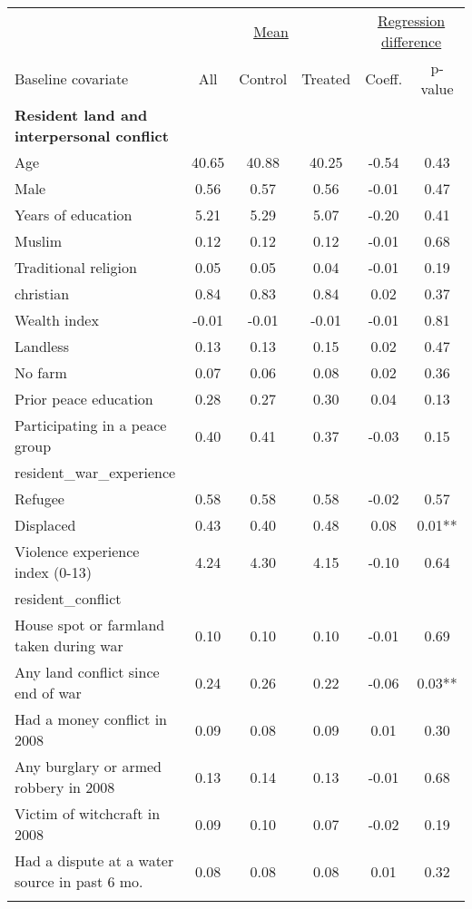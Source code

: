 \begin{tabular}{lccccc}
\hline \noalign{\smallskip} & \multicolumn{3}{c}{\uline{\hfill Mean \hfill}} & \multicolumn{2}{c}{\uline{\hfill Regression difference \hfill}}\\
Baseline covariate & All & Control & Treated & Coeff. & p-value\\
\noalign{\smallskip}\hline \noalign{\smallskip}\textbf{Resident land and interpersonal conflict} &  &  &  &  & \\
Age & 40.65 & 40.88 & 40.25 & -0.54 & 0.43\\
Male & 0.56 & 0.57 & 0.56 & -0.01 & 0.47\\
Years of education & 5.21 & 5.29 & 5.07 & -0.20 & 0.41\\
Muslim & 0.12 & 0.12 & 0.12 & -0.01 & 0.68\\
Traditional religion & 0.05 & 0.05 & 0.04 & -0.01 & 0.19\\
christian & 0.84 & 0.83 & 0.84 & 0.02 & 0.37\\
Wealth index & -0.01 & -0.01 & -0.01 & -0.01 & 0.81\\
Landless & 0.13 & 0.13 & 0.15 & 0.02 & 0.47\\
No farm & 0.07 & 0.06 & 0.08 & 0.02 & 0.36\\
Prior peace education & 0.28 & 0.27 & 0.30 & 0.04 & 0.13\\
Participating in a peace group & 0.40 & 0.41 & 0.37 & -0.03 & 0.15\\
resident_war_experience &  &  &  &  & \\
Refugee & 0.58 & 0.58 & 0.58 & -0.02 & 0.57\\
Displaced & 0.43 & 0.40 & 0.48 & 0.08 & 0.01**\\
Violence experience index (0-13) & 4.24 & 4.30 & 4.15 & -0.10 & 0.64\\
resident_conflict &  &  &  &  & \\
House spot or farmland taken during war & 0.10 & 0.10 & 0.10 & -0.01 & 0.69\\
Any land conflict since end of war & 0.24 & 0.26 & 0.22 & -0.06 & 0.03**\\
Had a money conflict in 2008 & 0.09 & 0.08 & 0.09 & 0.01 & 0.30\\
Any burglary or armed robbery in 2008 & 0.13 & 0.14 & 0.13 & -0.01 & 0.68\\
Victim of witchcraft in 2008 & 0.09 & 0.10 & 0.07 & -0.02 & 0.19\\
Had a dispute at a water source in past 6 mo. & 0.08 & 0.08 & 0.08 & 0.01 & 0.32\\
\noalign{\smallskip}\hline\end{tabular}
